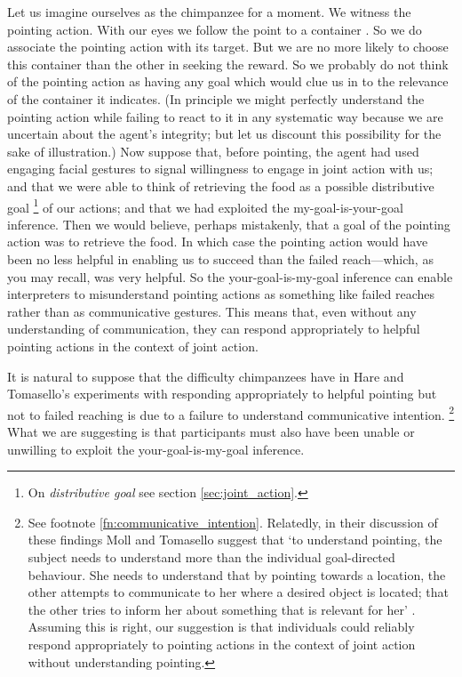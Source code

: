 \documentclass[14pt,a4paper]{extarticle}
\begin{document}
Let us imagine ourselves as the chimpanzee  for a moment.
We witness the pointing action.
With our eyes we follow the point to a container \citep[see][p.\ 6]{Moll:2007gu}.
So we do associate the pointing action with its target.
But we are no more likely to choose this container than the other in seeking the reward.
So we probably do not think of the pointing action as having any goal which would clue us in to the relevance of the container it indicates.
(In principle we might perfectly understand the pointing action while failing to react to it in any systematic way because we are uncertain about the agent's integrity; but let us discount this possibility for the sake of illustration.)
Now suppose 
that, 
before pointing, the agent had used engaging facial gestures to signal willingness to engage in joint action with us; and
that
we were able to think of retrieving the food as a possible distributive goal%
\footnote{
    On \emph{distributive goal} see section \vref{sec:joint_action}.
  }
of our actions;
and 
that we had exploited the my-goal-is-your-goal inference.
Then we would believe,
perhaps mistakenly,
that a goal of the pointing action was to retrieve the food.
In which case the pointing action would have been no less helpful in enabling us to succeed than the failed reach---which, as you may recall, was very helpful.
So the your-goal-is-my-goal inference can 
enable interpreters
to  
misunderstand pointing actions as something like  failed reaches rather than as communicative gestures.
This means that,
even without any understanding of communication,
they can respond appropriately to helpful pointing actions in the context of joint action.


It is natural to suppose that the difficulty chimpanzees have in Hare and Tomasello's experiments with responding appropriately to helpful pointing but not to failed reaching
is due to a failure to understand communicative intention.%
\footnote{
See  footnote \vref{fn:communicative_intention}.
Relatedly,
in their discussion of these findings
Moll and Tomasello suggest that
`to understand pointing, the subject needs to understand more than the individual goal-directed behaviour. 
She needs to understand that by pointing towards a location, the other attempts to communicate to her where a desired object is located; that the other tries to inform her about something that is relevant for her'
\citep[p.\ 6]{Moll:2007gu}.
Assuming this is right, our suggestion is that individuals could reliably  respond  appropriately to pointing actions in the context of joint action without understanding pointing.
}
What we are suggesting is that participants must also have been unable or unwilling to 
exploit the your-goal-is-my-goal inference.
\end{document}
